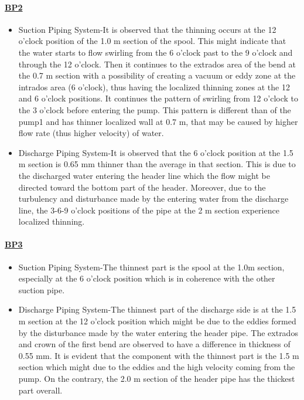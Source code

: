 \paragraph{\underline{BP2}}
\begin{itemize}
\item Suction Piping System-It is observed that the thinning occurs at the 12 o'clock position of the 1.0 m section of the spool. This might indicate that the water starts to flow swirling from the 6 o'clock past to the 9 o'clock and through the 12 o'clock. Then it continues to the extrados area of the bend at the 0.7 m section with a possibility of creating a vacuum or eddy zone at the intrados area (6 o'clock), thus having the localized thinning zones at the 12 and 6 o'clock positions. It continues the pattern of swirling from 12 o'clock to the 3 o'clock before entering the pump. This pattern is different than of the pump1 and has thinner localized wall at 0.7 m, that may be caused by higher flow rate (thus higher velocity) of water.

\item Discharge Piping System-It is observed that the 6 o'clock position at the 1.5 m section is 0.65 mm thinner than the average in that section. This is due to the discharged water entering the header line which the flow might be directed toward the bottom part of the header. Moreover, due to the turbulency and disturbance made by the entering water from the discharge line, the 3-6-9 o'clock positions of the pipe at the 2 m section experience localized thinning.

\end{itemize}

\paragraph{\underline{BP3}}
\begin{itemize}
	\item Suction Piping System-The thinnest part is the spool at the 1.0m section, especially at the 6 o'clock position which is in coherence with the other suction pipe.
	\item Discharge Piping System-The thinnest part of the discharge side is at the 1.5 m section at the 12 o'clock position which might be due to the eddies formed by the disturbance made by the water entering the header pipe. The extrados and crown of the first bend are observed to have a difference in thickness of 0.55 mm. It is evident that the component with the thinnest part is the 1.5 m section which might due to the eddies and the high velocity coming from the pump. On the contrary, the 2.0 m section of the header pipe has the thickest part overall.
	
\end{itemize}

